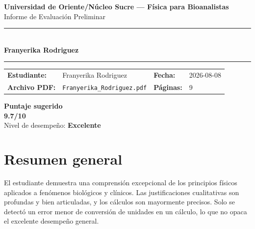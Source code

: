 \documentclass[11pt,a4paper]{article}
\begin{document}
\begin{center}
  {\Large\bfseries\color{azulTitulo} Universidad de Oriente/Núcleo Sucre --- Física para Bioanalistas}\\[4pt]
  {\large Informe de Evaluación Preliminar}\\[12pt]
  \rule{\linewidth}{1.2pt}\\[6pt]
  {\LARGE\bfseries Franyerika Rodriguez}\\[4pt]
  \rule{\linewidth}{0.6pt}
\end{center}

\vspace{4pt}
\begin{tcolorbox}[cajaTitulo, title=Datos del informe]
\begin{tabular}{@{}llll@{}}
  \textbf{Estudiante:}  & Franyerika Rodriguez  &
  \textbf{Fecha:}       & 2026-08-08 \\[4pt]
  \textbf{Archivo PDF:} & \texttt{Franyerika\_Rodriguez.pdf}  &
  \textbf{Páginas:}     & 9 \\
\end{tabular}
\end{tcolorbox}

\vspace{6pt}
\begin{center}
  \begin{tcolorbox}[
    enhanced,
    colback=white, colframe=desempeno_excelente,
    width=0.62\linewidth,
    boxrule=2pt,
    halign=center, valign=center,
    top=8pt, bottom=8pt,
  ]
    \centering
    {\large\bfseries Puntaje sugerido}\\[6pt]
    {\Huge\bfseries\color{desempeno_excelente} 9.7/10}\\[6pt]
    {\large Nivel de desempeño: \textbf{\color{desempeno_excelente} Excelente}}
  \end{tcolorbox}
\end{center}

\section*{Resumen general}
El estudiante demuestra una comprensión excepcional de los principios físicos aplicados a fenómenos biológicos y clínicos. Las justificaciones cualitativas son profundas y bien articuladas, y los cálculos son mayormente precisos. Solo se detectó un error menor de conversión de unidades en un cálculo, lo que no opaca el excelente desempeño general.
\end{document}
